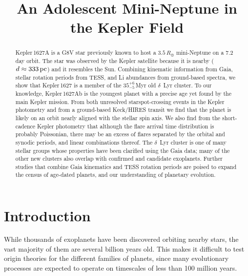\documentclass[12pt,modern,twocolumn,tighten]{aastex63}
\begin{document}
\title{
  An Adolescent Mini-Neptune in the Kepler Field
}



\begin{abstract}
  Kepler\,1627A is a G8V star previously known to host a
  $3.5\,R_\oplus$ mini-Neptune on a 7.2\,day orbit.  The star was
  observed by the Kepler satellite because it is nearby ($d\approx
  333\,{\rm pc}$) and it resembles the Sun.  Combining kinematic
  information from Gaia, stellar rotation periods from TESS, and Li
  abundances from ground-based spectra, we show that Kepler\,1627 is a
  member of the $35^{+6}_{-5}$\,Myr old $\delta$~Lyr cluster.  To our
  knowledge, Kepler\,1627Ab is the youngest planet with a precise age
  yet found by the main Kepler mission.  From both unresolved
  starspot-crossing events in the Kepler photometry and from a
  ground-based Keck/HIRES transit we find that the planet is likely on
  an orbit nearly aligned with the stellar spin axis.  We also find
  from the short-cadence Kepler photometry that although the flare
  arrival time distribution is probably Poissonian, there may be an
  excess of flares separated by the orbital and synodic periods, and
  linear combinations thereof.  The $\delta$~Lyr cluster is one of
  many stellar groups whose properties have been clarified using the
  Gaia data; many of the other new clusters also overlap with
  confirmed and candidate exoplanets.  Further studies that combine
  Gaia kinematics and TESS rotation periods are poised to expand
  the census of age-dated planets, and our understanding of planetary
  evolution.
\end{abstract}




\section{Introduction}

While thousands of exoplanets have been discovered orbiting nearby
stars, the vast majority of them are several billion years old.  This
makes it difficult to test origin theories for the different families
of planets, since many evolutionary processes are expected to operate
on timescales of less than 100 million years.
\end{document}
